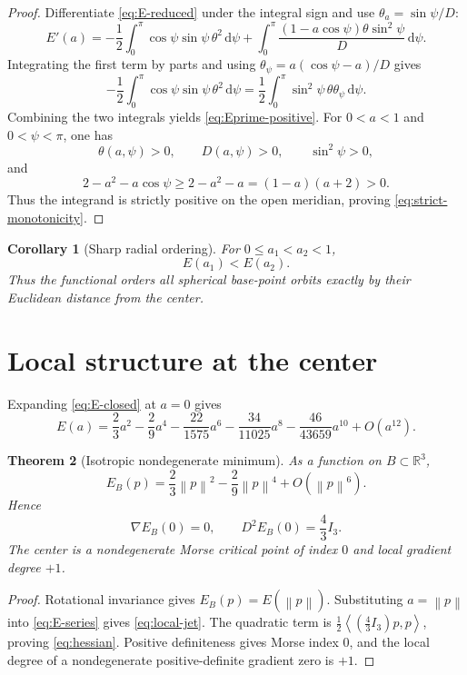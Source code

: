 \documentclass[11pt]{article}
\newtheorem{theorem}{Theorem}[section]
\newtheorem{corollary}[theorem]{Corollary}
\theoremstyle{definition}
\newcommand{\R}{\mathbb{R}}
\newcommand{\dd}{\,\mathrm{d}}
\newcommand{\ip}[2]{\left\langle #1,#2\right\rangle}
\newcommand{\norm}[1]{\left\lVert #1\right\rVert}
\begin{document}
\begin{proof}
Differentiate \eqref{eq:E-reduced} under the integral sign and use $\theta_a=\sin\psi/D$:
\[
E'(a)
=
-\frac12\int_0^\pi\cos\psi\sin\psi\,\theta^2\dd\psi
+
\int_0^\pi
\frac{(1-a\cos\psi)\theta\sin^2\psi}{D}\dd\psi.
\]
Integrating the first term by parts and using $\theta_\psi=a(\cos\psi-a)/D$ gives
\[
-\frac12\int_0^\pi\cos\psi\sin\psi\,\theta^2\dd\psi
=
\frac12\int_0^\pi\sin^2\psi\,\theta\theta_\psi\dd\psi.
\]
Combining the two integrals yields \eqref{eq:Eprime-positive}.  For $0<a<1$ and $0<\psi<\pi$, one has
\[
\theta(a,\psi)>0,
\qquad
D(a,\psi)>0,
\qquad
\sin^2\psi>0,
\]
and
\[
2-a^2-a\cos\psi
\geq
2-a^2-a
=(1-a)(a+2)>0.
\]
Thus the integrand is strictly positive on the open meridian, proving \eqref{eq:strict-monotonicity}.
\end{proof}

\begin{corollary}[Sharp radial ordering]
For $0\leq a_1<a_2<1$,
\[
E(a_1)<E(a_2).
\]
Thus the functional orders all spherical base-point orbits exactly by their Euclidean distance from the center.
\end{corollary}

\section{Local structure at the center}

Expanding \eqref{eq:E-closed} at $a=0$ gives
\begin{equation}
E(a)
=
\frac23a^2
-
\frac29a^4
-
\frac{22}{1575}a^6
-
\frac{34}{11025}a^8
-
\frac{46}{43659}a^{10}
+O(a^{12}).
\label{eq:E-series}
\end{equation}

\begin{theorem}[Isotropic nondegenerate minimum]
As a function on $B\subset\R^3$,
\begin{equation}
E_B(p)
=
\frac23\norm p^2
-
\frac29\norm p^4
+O(\norm p^6).
\label{eq:local-jet}
\end{equation}
Hence
\begin{equation}
\nabla E_B(0)=0,
\qquad
D^2E_B(0)=\frac43I_3.
\label{eq:hessian}
\end{equation}
The center is a nondegenerate Morse critical point of index $0$ and local gradient degree $+1$.
\end{theorem}

\begin{proof}
Rotational invariance gives $E_B(p)=E(\norm p)$.  Substituting $a=\norm p$ into \eqref{eq:E-series} gives \eqref{eq:local-jet}.  The quadratic term is $\frac12\ip{(\frac43I_3)p}{p}$, proving \eqref{eq:hessian}.  Positive definiteness gives Morse index $0$, and the local degree of a nondegenerate positive-definite gradient zero is $+1$.
\end{proof}
\end{document}
